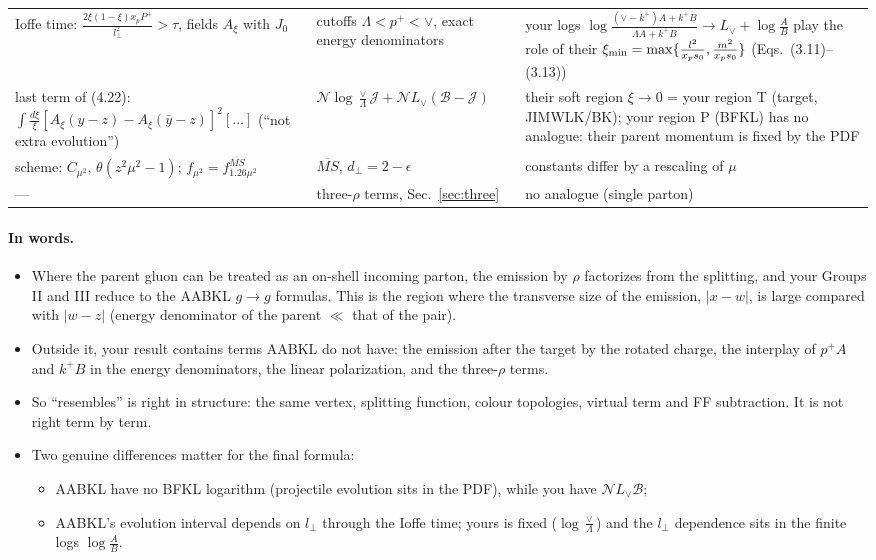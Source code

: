 \documentclass[10pt]{article}
\numberwithin{equation}{section}
\newcommand{\Lv}{L_{\vee}}
\newcommand{\JJ}{\mathcal J}
\newcommand{\BB}{\mathcal B}
\newcommand{\NN}{\mathcal N}
\begin{document}
{\begin{longtable}{@{}>{\raggedright\arraybackslash}p{}>{\raggedright\arraybackslash}p{}>{\raggedright\arraybackslash}p{}@{}}
Ioffe time: $\frac{2\xi(1-\xi)x_pP^+}{l^2_\perp}>\tau$, fields $A_\xi$ with $J_0$ & cutoffs $\Lambda<p^+<\vee$, exact energy denominators & your logs $\log\frac{(\vee-k^+)A+k^+B}{\Lambda A+k^+B}\to\Lv+\log\frac AB$ play the role of their $\xi_{\rm min}=\max\{\frac{l^2}{x_ps_0},\frac{m^2}{x_ps_0}\}$ (Eqs.~(3.11)--(3.13))\\
last term of (4.22): $\int\frac{d\xi}\xi[A_\xi(y-z)-A_\xi(\bar y-z)]^2[\dots]$ (``not extra evolution'') & $\NN\log\frac\vee\Lambda\JJ+\NN\Lv(\BB-\JJ)$ & their soft region $\xi\to0$ = your region T (target, JIMWLK/BK); your region P (BFKL) has no analogue: their parent momentum is fixed by the PDF\\
scheme: $C_{\mu^2}$, $\theta(z^2\mu^2-1)$; $f_{\mu^2}=f^{\overline{MS}}_{1.26\mu^2}$ & $\overline{MS}$, $d_\perp=2-\epsilon$ & constants differ by a rescaling of $\mu$\\
--- & three-$\rho$ terms, Sec.~\ref{sec:three} & no analogue (single parton)\\\bottomrule
\end{longtable}}

\paragraph{In words.}
\begin{itemize}
\item Where the parent gluon can be treated as an on-shell incoming parton, the emission by $\rho$ factorizes from the splitting, and your Groups II and III reduce to the AABKL $g\to g$ formulas. This is the region where the transverse size of the emission, $|x-w|$, is large compared with $|w-z|$ (energy denominator of the parent $\ll$ that of the pair).
\item Outside it, your result contains terms AABKL do not have: the emission after the target by the rotated charge, the interplay of $p^+A$ and $k^+B$ in the energy denominators, the linear polarization, and the three-$\rho$ terms.
\item So ``resembles'' is right in structure: the same vertex, splitting function, colour topologies, virtual term and FF subtraction. It is not right term by term.
\item Two genuine differences matter for the final formula:
\begin{itemize}
\item AABKL have no BFKL logarithm (projectile evolution sits in the PDF), while you have $\NN\Lv\BB$;
\item AABKL's evolution interval depends on $l_\perp$ through the Ioffe time; yours is fixed ($\log\frac\vee\Lambda$) and the $l_\perp$ dependence sits in the finite logs $\log\frac AB$.
\end{itemize}
\end{itemize}
\end{document}
